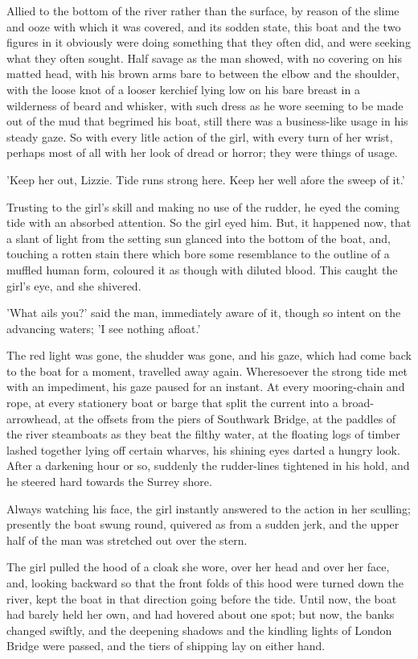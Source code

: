 Allied to the bottom of the river rather than the surface, by reason
of the slime and ooze with which it was covered, and its sodden
state, this boat and the two figures in it obviously were doing
something that they often did, and were seeking what they often
sought. Half savage as the man showed, with no covering on his
matted head, with his brown arms bare to between the elbow and
the shoulder, with the loose knot of a looser kerchief lying low on
his bare breast in a wilderness of beard and whisker, with such
dress as he wore seeming to be made out of the mud that begrimed
his boat, still there was a business-like usage in his steady gaze.
So with every litle action of the girl, with every turn of her wrist,
perhaps most of all with her look of dread or horror; they were
things of usage.

'Keep her out, Lizzie. Tide runs strong here. Keep her well afore
the sweep of it.'

Trusting to the girl's skill and making no use of the rudder, he eyed
the coming tide with an absorbed attention. So the girl eyed him.
But, it happened now, that a slant of light from the setting sun
glanced into the bottom of the boat, and, touching a rotten stain
there which bore some resemblance to the outline of a muffled
human form, coloured it as though with diluted blood. This caught
the girl's eye, and she shivered.

'What ails you?' said the man, immediately aware of it, though so
intent on the advancing waters; 'I see nothing afloat.'

The red light was gone, the shudder was gone, and his gaze, which
had come back to the boat for a moment, travelled away again.
Wheresoever the strong tide met with an impediment, his gaze
paused for an instant. At every mooring-chain and rope, at every
stationery boat or barge that split the current into a broad-arrowhead,
at the offsets from the piers of Southwark Bridge, at the
paddles of the river steamboats as they beat the filthy water, at the
floating logs of timber lashed together lying off certain wharves,
his shining eyes darted a hungry look. After a darkening hour or
so, suddenly the rudder-lines tightened in his hold, and he steered
hard towards the Surrey shore.

Always watching his face, the girl instantly answered to the action
in her sculling; presently the boat swung round, quivered as from a
sudden jerk, and the upper half of the man was stretched out over
the stern.

The girl pulled the hood of a cloak she wore, over her head and
over her face, and, looking backward so that the front folds of this
hood were turned down the river, kept the boat in that direction
going before the tide.
Until now, the boat had barely held her own,
and had hovered about one spot; but now, the banks changed
swiftly, and the deepening shadows and the kindling lights of
London Bridge were passed, and the tiers of shipping lay on either
hand.

